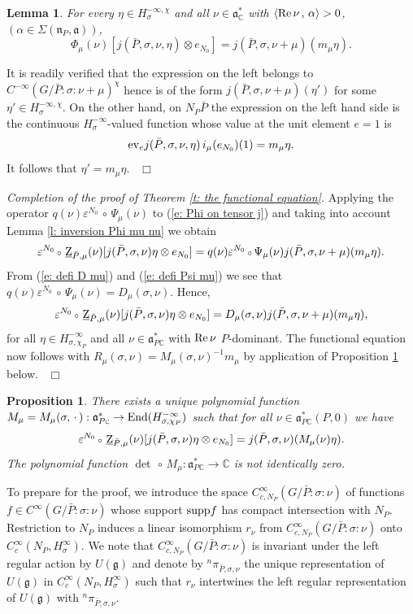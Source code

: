 \documentclass[12pt,a4paper]{article}
\newtheorem{Lemma}[Thm]{Lemma}
\newtheorem{Prop}[Thm]{Proposition}
\newenvironment{lemma}[0]{\begin{Lemma}\noindent}%
{\end{Lemma}}
\newenvironment{prop}[0]{\begin{Prop}\noindent}%
{\end{Prop}}
\def\proof{\par\noindent{\it Proof.}{\ }{\ }}
\def\qed{~\hfill\hbox{$\Box$}\medbreak}
\def\msy#1{{\mathbb #1}}
\def\C{{\msy C}}
\def\ga{\alpha}
\def\ge{\varepsilon}
\def\gs{\sigma}
\def\gS{\Sigma}
\def\got#1{\mathfrak #1}
\def\fa{{\got a}}
\def\fg{{\got g}}
\def\fn{{\got n}}
\def\to{\rightarrow}
\def\Re{{\rm Re}\,}
\def\inp#1#2{\langle#1\,,\,#2\rangle}
\def\End{{\rm End}}
\def\after{\,{\scriptstyle\circ}\,}
\def\iC{{\scriptscriptstyle \C}}
\numberwithin{Thm}{section}
\numberwithin{equation}{section}
\def\supp{{\rm supp}}
\def\dotvar{\, \cdot\,}
\def\ev{{\rm ev}}
\def\fadc{\fa_\C^*}
\def\faPdc{{\fa_{P\iC}^*}}
\numberwithin{equation}{section}
\def\faPdc{\fa_{P\iC}^*}
\def\ulZ{\, \underline{\rm Z}}
\def\cchi{\chi}
\begin{document}
\begin{lemma}
For every $\eta\in H_\gs^{-\infty,\cchi}$ and all $\nu\in \fadc$ with 
$\inp {\Re \nu}{\ga} > 0$, $(\ga \in \gS(\fn_P, \fa))$,
\begin{equation}
\label{e: Phi on tensor j}
\Phi_\mu(\nu)[ j(\bar P , \gs, \nu, \eta) \otimes e_{N_0}] = j(\bar P, \gs,\nu + \mu) (m_\mu  \eta).
\end{equation}
\end{lemma}

\proof
It is readily verified that the expression on the left belongs
to $C^{-\infty}(G/\bar P :\gs: \nu + \mu)^{\cchi}$ hence is of the form 
$j(\bar P, \gs,\nu + \mu)(\eta')$ for some $\eta' \in H_\gs^{-\infty,\cchi}.$ 
On the other hand, on $N_P \bar P$ the expression on the 
left hand side is the continuous $H_\gs^{-\infty}$-valued function 
whose value at the unit element $e=1$ is 
$$ 
\ev_e j(\bar P , \gs, \nu, \eta)\, i_\mu(e_{N_0})(1) = m_\mu \eta.
$$
It follows that $\eta' = m_\mu \eta.$ 
\qed

{\em Completion of the proof of Theorem \ref{t: the functional equation}. } 
Applying the operator $q(\nu) \ge^{N_0} \after \Psi_\mu(\nu)$  to  
(\ref{e: Phi on tensor j}) and taking into account Lemma \ref{l: inversion Phi mu nu}
we obtain
$$ 
 \ge^{N_0}\after \ulZ_{\bar P, \mu}(\nu) [ j(\bar P , \gs, \nu) \eta \otimes e_{N_0}] = 
q(\nu) \ge^{N_0} \after \Psi_\mu(\nu) j(\bar P, \gs,\nu + \mu) (m_\mu  \eta).
$$ 
From (\ref{e: defi D mu}) and (\ref{e: defi Psi mu}) we see that
$
q(\nu) \ge^{N_0} \after \Psi_\mu(\nu) = D_\mu(\gs, \nu).
$
Hence, 
$$ 
\ge^{N_0} \after \ulZ_{\bar P, \mu}(\nu) [ j(\bar P , \gs, \nu)\eta \otimes e_{N_0}] = 
D_{ \mu}(\gs, \nu) j(\bar P, \gs,\nu + \mu)( m_\mu  \eta),
$$ 
for all $\eta \in H_{\gs,\cchi_P}^{-\infty}$ and all $\nu \in \faPdc$ with $\Re \nu$ $P$-dominant. 
The functional equation now follows with $R_{\mu}(\gs, \nu) = M_{\mu}(\gs, \nu)^{-1} m_\mu$ 
by application of Proposition \ref{p: intro M mu nu} below.
\qed
\begin{prop}
\label{p: intro M mu nu}
There exists a unique polynomial function 
$M_\mu = M_\mu(\gs, \dotvar): \faPdc \to \End(H_{\gs,\cchi_P}^{-\infty})$ 
such that for all $\nu \in \faPdc(P,0)$ we have
$$ 
\ge^{N_0} \after \ulZ_{\bar P, \mu}(\nu) [ j(\bar P, \gs, \nu) \eta \otimes e_{N_0}]
=  j(\bar P, \gs, \nu)( M_\mu (\nu) \eta).
$$ 
The polynomial function $\det \after M_\mu: \faPdc \to \C$ is not identically zero.
\end{prop}

To prepare for the proof, we introduce the space 
 $C^\infty_{c,N_P}(G/\bar P: \gs: \nu)$ of functions $f \in C^\infty(G/\bar P: \gs: \nu)$ 
whose support $\supp f$ has compact intersection with $N_P.$ Restriction to $N_P$ induces a linear
isomorphism $r_\nu$ from $C^\infty_{c,N_P}(G/\bar P: \gs: \nu)$ onto $C^\infty_c(N_P, H_\gs^\infty).$ 
We note that $C^\infty_{c, N_P}(G/\bar P: \gs: \nu)$ is invariant under the left regular action 
by $U(\fg)$ and denote by ${}^n \pi_{\bar P, \gs, \nu}$ the unique representation of $U(\fg)$ in $C^\infty_c(N_P, H_\gs^\infty)$ such that  $r_\nu$ intertwines the left regular representation of $U(\fg)$ with ${}^n \pi_{\bar P, \gs, \nu}.$ 
\end{document}
